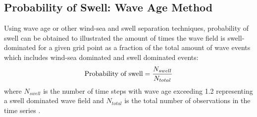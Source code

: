 \documentclass[draft,linenumbers]{agujournal2018}
\begin{document}

\subsection{Probability of Swell: Wave Age Method}

Using wave age or other wind-sea and swell separation techniques, probability of swell can be obtained to illustrated the amount of times the wave field is swell-dominated for a given grid point as a fraction of the total amount of wave events which includes wind-sea dominated and swell dominated events:
\begin{equation}
    \mbox{\rm Probability of swell} = \frac{N_{swell}}{N_{total}}
\end{equation}
where $N_{swell}$ is the number of time steps with wave age exceeding 1.2 representing a swell dominated wave field and $N_{total}$ is the total number of observations in the time series .
\end{document}

